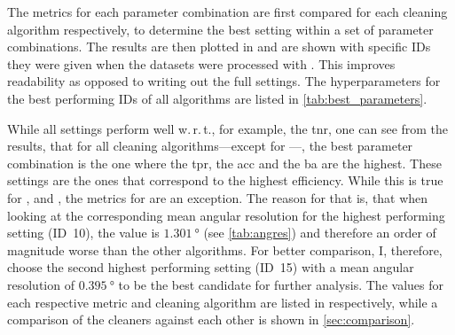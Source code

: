 The metrics for each parameter combination are first compared for each cleaning algorithm respectively,
to determine the best setting within a set of parameter combinations. The results are then plotted in
and are shown with specific IDs they were given when the datasets were processed with \ctapipe.
This improves readability as opposed to writing out the full settings. The hyperparameters for the best performing
IDs of all algorithms are listed in \autoref{tab:best_parameters}.

While all settings perform well w.\,r.\,t., for example, the \gls{tnr}, one can see from the results, that for all cleaning
algorithms---except for \mars{}---, the best parameter combination is the one where the \gls{tpr}, the \gls{acc} and the \gls{ba}
are the highest. These settings are the ones that correspond to the highest efficiency. While this is true
for \tailcuts{}, \fact{} and \tcc{}, the metrics for \mars{} are an exception. The reason for that is, that when
looking at the corresponding mean angular resolution for the highest performing setting (ID~10), the value is
\(\SI{1.301}{\degree}\) (see \autoref{tab:angres}) and therefore an order of magnitude worse than the other algorithms. For better
comparison, I, therefore, choose the second highest performing setting (ID~15) with a mean angular
resolution of \(\SI{0.395}{\degree}\) to be the best candidate for further analysis.
The values for each respective metric and cleaning algorithm are listed in
 respectively, while
a comparison of the cleaners against each other is shown in \autoref{sec:comparison}.
\begin{table}
    \centering
    \caption{Results for the metrics of \tailcuts{}. One can see, that the best results are obtained
    for the setting with ID~47.}
    \label{tab:metrics_tail}
\end{table}

